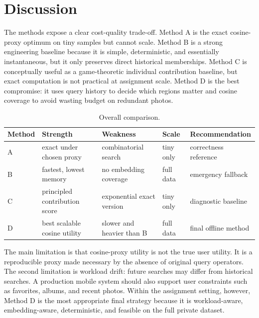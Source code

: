 \documentclass[sigconf,nonacm]{acmart}
\begin{document}
\FloatBarrier

\section{Discussion}

The methods expose a clear cost-quality trade-off. Method A is the exact cosine-proxy optimum on tiny samples but cannot scale. Method B is a strong engineering baseline because it is simple, deterministic, and essentially instantaneous, but it only preserves direct historical memberships. Method C is conceptually useful as a game-theoretic individual contribution baseline, but exact computation is not practical at assignment scale. Method D is the best compromise: it uses query history to decide which regions matter and cosine coverage to avoid wasting budget on redundant photos.

\begin{table}[!htbp]
  \centering
  \caption{Overall comparison.}
  \label{tab:overall}
  \small
  \begin{tabularx}{\textwidth}{@{}lYYYY@{}}
    \toprule
    Method & Strength & Weakness & Scale & Recommendation \\
    \midrule
    A & exact under chosen proxy & combinatorial search & tiny only & correctness reference \\
    B & fastest, lowest memory & no embedding coverage & full data & emergency fallback \\
    C & principled contribution score & exponential exact version & tiny only & diagnostic baseline \\
    D & best scalable cosine utility & slower and heavier than B & full data & final offline method \\
    \bottomrule
  \end{tabularx}
\end{table}

The main limitation is that cosine-proxy utility is not the true user utility. It is a reproducible proxy made necessary by the absence of original query operators. The second limitation is workload drift: future searches may differ from historical searches. A production mobile system should also support user constraints such as favorites, albums, and recent photos. Within the assignment setting, however, Method D is the most appropriate final strategy because it is workload-aware, embedding-aware, deterministic, and feasible on the full private dataset.

\FloatBarrier
\end{document}
